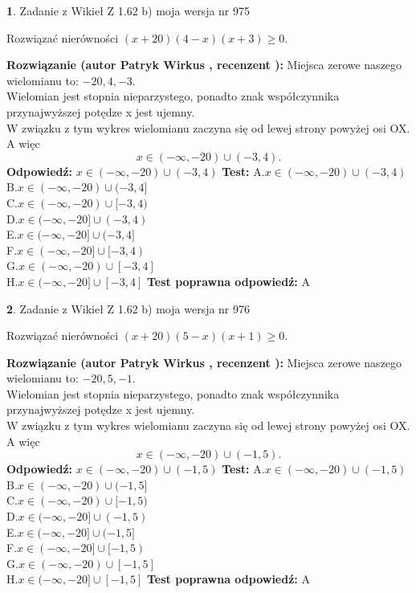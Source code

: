 \documentclass[12pt, a4paper]{article}
\theoremstyle{definition} %
\newtheorem{zad}{}
\newcommand{\zadStart}[1]{\begin{zad}#1\newline}
\newcommand{\zadStop}{\end{zad}}
\newcommand{\rozwStart}[2]{\noindent \textbf{Rozwiązanie (autor #1 , recenzent #2): }\newline}
\newcommand{\rozwStop}{\newline}
\newcommand{\odpStart}{\noindent \textbf{Odpowiedź:}\newline}
\newcommand{\odpStop}{\newline}
\newcommand{\testStart}{\noindent \textbf{Test:}\newline}
\newcommand{\testStop}{\newline}
\newcommand{\kluczStart}{\noindent \textbf{Test poprawna odpowiedź:}\newline}
\newcommand{\kluczStop}{\newline}
\begin{document}
\zadStart{Zadanie z Wikieł Z 1.62 b) moja wersja nr 975}

Rozwiązać nierówności $(x+20)(4-x)(x+3)\ge0$.
\zadStop
\rozwStart{Patryk Wirkus}{}
Miejsca zerowe naszego wielomianu to: $-20, 4, -3$.\\
Wielomian jest stopnia nieparzystego, ponadto znak współczynnika przy\linebreak najwyższej potędze x jest ujemny.\\ W związku z tym wykres wielomianu zaczyna się od lewej strony powyżej osi OX. A więc $$x \in (-\infty,-20) \cup (-3,4).$$
\rozwStop
\odpStart
$x \in (-\infty,-20) \cup (-3,4)$
\odpStop
\testStart
A.$x \in (-\infty,-20) \cup (-3,4)$\\
B.$x \in (-\infty,-20) \cup (-3,4]$\\
C.$x \in (-\infty,-20) \cup [-3,4)$\\
D.$x \in (-\infty,-20] \cup (-3,4)$\\
E.$x \in (-\infty,-20] \cup (-3,4]$\\
F.$x \in (-\infty,-20] \cup [-3,4)$\\
G.$x \in (-\infty,-20) \cup [-3,4]$\\
H.$x \in (-\infty,-20] \cup [-3,4]$
\testStop
\kluczStart
A
\kluczStop



\zadStart{Zadanie z Wikieł Z 1.62 b) moja wersja nr 976}

Rozwiązać nierówności $(x+20)(5-x)(x+1)\ge0$.
\zadStop
\rozwStart{Patryk Wirkus}{}
Miejsca zerowe naszego wielomianu to: $-20, 5, -1$.\\
Wielomian jest stopnia nieparzystego, ponadto znak współczynnika przy\linebreak najwyższej potędze x jest ujemny.\\ W związku z tym wykres wielomianu zaczyna się od lewej strony powyżej osi OX. A więc $$x \in (-\infty,-20) \cup (-1,5).$$
\rozwStop
\odpStart
$x \in (-\infty,-20) \cup (-1,5)$
\odpStop
\testStart
A.$x \in (-\infty,-20) \cup (-1,5)$\\
B.$x \in (-\infty,-20) \cup (-1,5]$\\
C.$x \in (-\infty,-20) \cup [-1,5)$\\
D.$x \in (-\infty,-20] \cup (-1,5)$\\
E.$x \in (-\infty,-20] \cup (-1,5]$\\
F.$x \in (-\infty,-20] \cup [-1,5)$\\
G.$x \in (-\infty,-20) \cup [-1,5]$\\
H.$x \in (-\infty,-20] \cup [-1,5]$
\testStop
\kluczStart
A
\kluczStop
\end{document}
